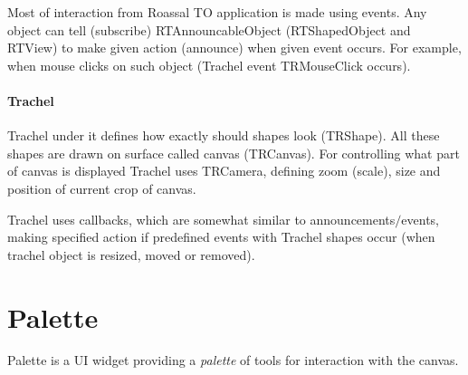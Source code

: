 \documentclass[a4paper,10pt,twoside]{book}
\begin{document}
Most of interaction from Roassal TO application is made using events. Any object can tell (subscribe) RTAnnouncableObject (RTShapedObject and RTView) to make given action (announce) when given event occurs. For example, when mouse clicks on such object (Trachel event TRMouseClick occurs).
\subsubsection{ Trachel}
Trachel under it defines how exactly should shapes look (TRShape). All these shapes are drawn on surface called canvas (TRCanvas). For controlling what part of canvas is displayed Trachel uses TRCamera, defining zoom (scale), size and position of current crop of canvas.

Trachel uses callbacks, which are somewhat similar to announcements$/$events, making specified action if predefined events with Trachel shapes occur (when trachel object is resized, moved or removed).
\chapter{ Palette}
Palette is a UI widget providing a \textit{palette} of tools for interaction with the canvas.
\end{document}

